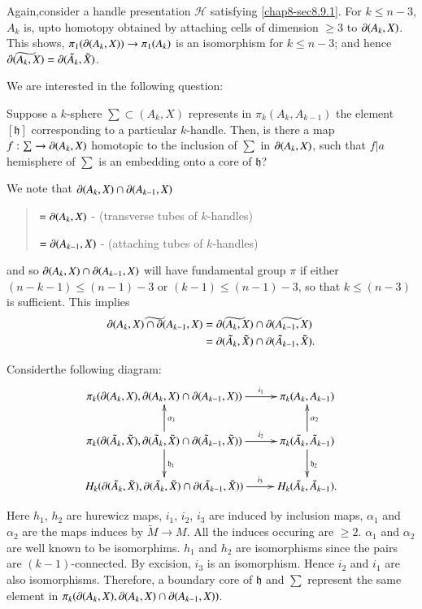 Again,\pageoriginale consider a handle presentation $\mathscr{H}$ satisfying \ref{chap8-sec8.9.1}. For $k\leq n-3$, $A_{k}$ is, upto homotopy obtained by attaching cells of dimension $\geq 3$ to $\partial(A_{k},X)$. This shows, $\pi_{1}(\partial(A_{k},X))\to \pi_{1}(A_{k})$ is an isomorphism for $k\leq n-3$; and hence $\widetilde{\partial(A_{k},X)}=\partial(\tilde{A}_{k},\tilde{X})$. 

We are interested in the following question:

Suppose a $k$-sphere $\sum\subset (A_{k},X)$ represents in $\pi_{k}(A_{k},A_{k-1})$ the element $[\mathfrak{h}]$ corresponding to a particular $k$-handle. Then, is there a map $f:\sum\to \partial(A_{k},X)$ homotopic to the inclusion of $\sum$ in $\partial(A_{k},X)$, such that $f|a$ hemisphere of $\sum$ is an embedding onto a core of $\mathfrak{h}$?

We note that $\partial(A_{k},X)\cap \partial(A_{k-1},X)$
\begin{quote}
$=\partial(A_{k},X)$ - (transverse tubes of $k$-handles)

$=\partial(A_{k-1},X)$ - (attaching tubes of $k$-handles)
\end{quote}
and so $\partial(A_{k},X)\cap \partial(A_{k-1},X)$ will have fundamental group $\pi$ if either $(n-k-1)\leq (n-1)-3$ or $(k-1)\leq (n-1)-3$, so that $k\leq (n-3)$ is sufficient. This implies
\begin{align*}
\widetilde{\partial(A_{k},X)\cap \partial(A_{k-1},X)} &= \widetilde{\partial(A_{k},X)}\cap \partial\widetilde{(A_{k-1},X)}\\
&= \partial(\tilde{A}_{k},\tilde{X})\cap\partial(\tilde{A}_{k-1},\tilde{X}).
\end{align*}

Consider\pageoriginale the following diagram:
\[
\xymatrix{
\pi_{k}(\p (A_{k},X),\p(A_{k},X)\cap \p(A_{k-1},X))\ar[r]^-{i_{1}} & \pi_{k}(A_{k},A_{k-1})\\
\pi_{k}(\p(\tilde{A}_{k},\tilde{X}),\p(\tilde{A}_{k},\tilde{X})\cap \p(\tilde{A}_{k-1},\tilde{X}))\ar[u]_{\alpha_{1}}\ar[r]^-{i_{2}}\ar[d]^{\mathfrak{h}_{1}} & \pi_{k}(\tilde{A}_{k},\tilde{A}_{k-1})\ar[d]^{\mathfrak{h}_{2}}\ar[u]_{\alpha_{2}}\\
H_{k}(\p(\tilde{A}_{k},\tilde{X}),\p(\tilde{A}_{k},\tilde{X})\cap \p(\tilde{A}_{k-1},\tilde{X}))\ar[r]^-{i_{3}} & H_{k}(\tilde{A}_{k},\tilde{A}_{k-1}).
}
\]

Here $h_{1}$, $h_{2}$ are hurewicz maps, $i_{1}$, $i_{2}$, $i_{3}$ are induced by inclusion maps, $\alpha_{1}$ and $\alpha_{2}$ are the maps induces by $\tilde{M}\to M$. All the induces occuring are $\geq 2$. $\alpha_{1}$ and $\alpha_{2}$ are well known to be isomorphims. $h_{1}$ and $h_{2}$ are isomorphisms since the pairs are $(k-1)$-connected. By excision, $i_{3}$ is an isomorphism. Hence $i_{2}$ and $i_{1}$ are also isomorphisms. Therefore, a boundary core of $\mathfrak{h}$ and $\sum$ represent the same element in $\pi_{k}(\partial(A_{k},X),\partial(A_{k},X)\cap \partial(A_{k-1},X))$.

